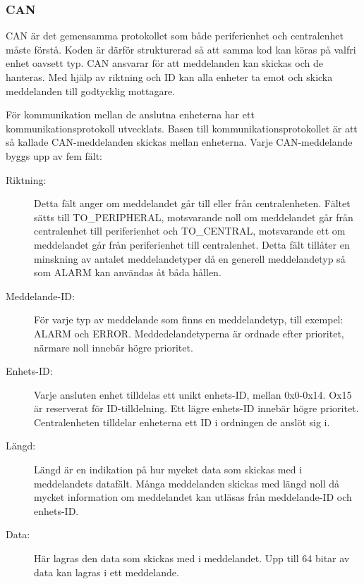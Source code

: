 \documentclass[a4paper]{article}
\begin{document}
\subsubsection{CAN}
CAN är det gemensamma protokollet som både periferienhet och centralenhet måste förstå.
Koden är därför strukturerad så att samma kod kan köras på valfri enhet oavsett typ.
CAN ansvarar för att meddelanden kan skickas och de hanteras.
Med hjälp av riktning och ID kan alla enheter ta emot och skicka meddelanden till godtycklig mottagare.

För kommunikation mellan de anslutna enheterna har ett kommunikationsprotokoll utvecklats. Basen till kommunikationsprotokollet är att så kallade CAN-meddelanden skickas mellan enheterna. Varje CAN-meddelande byggs upp av fem fält:
\begin{description}
    \item[Riktning:] Detta fält anger om meddelandet går till eller från centralenheten.
    Fältet sätts till TO\_PERIPHERAL, motsvarande noll om meddelandet går från centralenhet till periferienhet och TO\_CENTRAL, motsvarande ett om meddelandet går från periferienhet till centralenhet. 
    Detta fält tillåter en minskning av antalet meddelandetyper då en generell meddelandetyp så som ALARM kan användas åt båda hållen.

    \item[Meddelande-ID:] För varje typ av meddelande som finns en meddelandetyp, till exempel: ALARM och ERROR.
    Meddedelandetyperna är ordnade efter prioritet, närmare noll innebär högre prioritet.
    
    \item[Enhets-ID:] Varje ansluten enhet tilldelas ett unikt enhets-ID, mellan 0x0-0x14. Ox15 är reserverat för ID-tilldelning. Ett lägre enhets-ID innebär högre prioritet.
    Centralenheten tilldelar enheterna ett ID i ordningen de anslöt sig i.
    
    \item[Längd:] Längd är en indikation på hur mycket data som skickas med i meddelandets datafält.
    Många meddelanden skickas med längd noll då mycket information om meddelandet kan utläsas från meddelande-ID och enhets-ID.

    \item[Data:] Här lagras den data som skickas med i meddelandet. Upp till 64 bitar av data kan lagras i ett meddelande.
\end{description}
\end{document}
